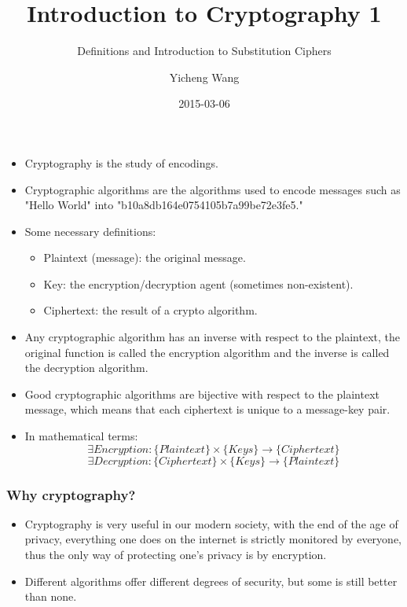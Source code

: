 \documentclass{beamer}
\title{Introduction to Cryptography 1}
\subtitle{Definitions and Introduction to Substitution Ciphers}
\author{Yicheng Wang}
\institute{White Hat Academy}
\date{2015-03-06}
\begin{document}
\frame{\titlepage}

\begin{frame}
\begin{itemize}
    \frametitle{What is Cryptography?}
    \item Cryptography is the study of encodings.
    \item Cryptographic algorithms are the algorithms used to encode messages
        such as "Hello World" into "b10a8db164e0754105b7a99be72e3fe5."
    \item Some necessary definitions:
        \begin{itemize}
            \item Plaintext (message): the original message.
            \item Key: the encryption/decryption agent (sometimes
                non-existent).
            \item Ciphertext: the result of a crypto algorithm.
        \end{itemize}
    \end{itemize}
\end{frame}

\begin{frame}
    \begin{itemize}
    \item Any cryptographic algorithm has an inverse with respect to the
        plaintext, the original function is called the encryption algorithm and
        the inverse is called the decryption algorithm.
    \item Good cryptographic algorithms are bijective with respect to the
        plaintext message, which means that each ciphertext is unique to a
        message-key pair.
    \item In mathematical terms:
        \[
            \exists Encryption: \{Plaintext\} \times \{Keys\} \to \{Ciphertext\}
        \]
        \[
            \exists Decryption: \{Ciphertext\} \times \{Keys\} \to \{Plaintext\}
        \]
\end{itemize}
\end{frame}

\begin{frame}
\frametitle{Why cryptography?}
\begin{itemize}
    \item Cryptography is very useful in our modern society, with the end of the
        age of privacy, everything one does on the internet is strictly
        monitored by everyone, thus the only way of protecting one's privacy is
        by encryption.
    \item Different algorithms offer different degrees of security, but some is
        still better than none.
\end{itemize}
\end{frame}
\end{document}
